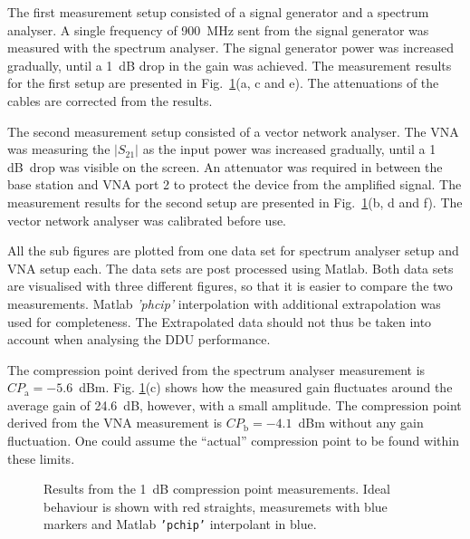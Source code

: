 \documentclass[a4paper, 12pt]{article}
\begin{document}
The first measurement setup consisted of a signal generator and a spectrum analyser. A single 
frequency of 900~MHz sent from the signal generator was measured with the spectrum analyser. 
The signal generator power was increased gradually, until a 1~dB drop in the gain was achieved. 
The measurement results for the first setup are presented in Fig.~\ref{f:1dB}(a, c and e). 
The attenuations of the cables are corrected from the results.

The second measurement setup consisted of a vector network analyser. The VNA was measuring 
the $|S_{21}|$ as the input power was increased gradually, until a 1 dB~drop was visible 
on the screen. An attenuator was required in between the base station and VNA port 2 
to protect the device from the amplified signal. The measurement results for the second setup 
are presented in Fig.~\ref{f:1dB}(b, d and f). The vector network analyser was calibrated 
before use. 

All the sub figures are plotted from one data set for spectrum analyser setup and VNA setup each. 
The data sets are post processed using Matlab. Both data sets are visualised with three different 
figures, so that it is easier to compare the two measurements. Matlab \textit{'phcip'} interpolation with 
additional extrapolation was used for completeness. The Extrapolated data should not thus be taken 
into account when analysing the DDU performance.

The compression point derived from the spectrum analyser measurement is \linebreak{}$CP_\mathrm{a} = -5.6$~dBm. 
Fig. \ref{f:1dB}(c) shows how the measured gain fluctuates around the average gain of 24.6~dB, 
however, with a small amplitude. The compression point derived from the VNA measurement is 
$CP_\mathrm{b} = -4.1$~dBm without any gain fluctuation. One could assume the ``actual'' 
compression point to be found within these limits.


\begin{figure}
\centering
{}
\caption{Results from the 1~dB compression point measurements. Ideal behaviour is shown with red straights, 
	measuremets with blue markers and Matlab \texttt{'pchip'} interpolant in blue.}\label{f:1dB}
\end{figure}
\end{document}
